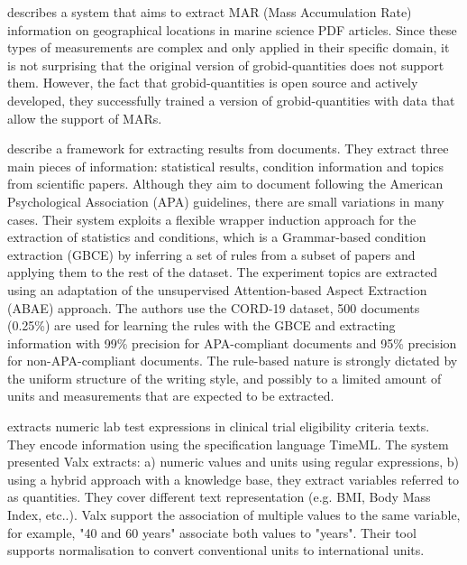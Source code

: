 \cite{petersen2021geoquantities} describes a system that aims to extract MAR (Mass Accumulation Rate) information on geographical locations in marine science PDF articles. Since these types of measurements are complex and only applied in their specific domain, it is not surprising that the original version of grobid-quantities does not support them. However, the fact that grobid-quantities is open source and actively developed, they successfully trained a version of grobid-quantities with data that allow the support of MARs. 



\cite{epp2021stereo} describe a framework for extracting results from documents. They extract three main pieces of information: statistical results, condition information and topics from scientific papers. Although they aim to document following the American Psychological Association (APA) guidelines, there are small variations in many cases. 
Their system exploits a flexible wrapper induction approach for the extraction of statistics and conditions, which is a Grammar-based condition extraction (GBCE) by inferring a set of rules from a subset of papers and applying them to the rest of the dataset. The experiment topics are extracted using an adaptation of the unsupervised Attention-based Aspect Extraction (ABAE) approach. 
The authors use the CORD-19 dataset, 500 documents (0.25\%) are used for learning the rules with the GBCE and extracting information with 99\% precision for APA-compliant documents and 95\% precision for non-APA-compliant documents. 
The rule-based nature is strongly dictated by the uniform structure of the writing style, and possibly to a limited amount of units and measurements that are expected to be extracted. 

\cite{hao2016} extracts numeric lab test expressions in clinical trial eligibility criteria texts. 
They encode information using the specification language TimeML. The system presented Valx extracts: a) numeric values and units using regular expressions, b) using a hybrid approach with a knowledge base, they extract variables referred to as quantities. They cover different text representation (e.g. BMI, Body Mass Index, etc..). Valx support the association of multiple values to the same variable, for example, "40 and 60 years" associate both values to "years". Their tool supports normalisation to convert conventional units to international units. 

